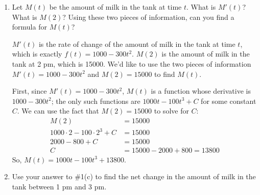 \documentclass[main]{subfiles}
\begin{document}
\begin{enumerate}
\begin{enumerate}
  \item

    \begin{problem}[\stretch{4}]
      Let $M(t)$ be the amount of milk in the tank at time $t$.  What is
      $M'(t)$?  What is $M(2)$?  Using these two pieces of information,
      can you find a formula for $M(t)$?
    \end{problem}

    \begin{solution}
      $M'(t)$ is the rate of change of the amount of milk in the tank at
      time $t$, which is exactly $f(t) = 1000 - 300t^2$.  $M(2)$ is the
      amount of milk in the tank at 2 pm, which is 15000.  We'd like to
      use the two pieces of information $M'(t) = 1000 - 300 t^2$ and $M(2)
      = 15000$ to find $M(t)$.

      First, since $M'(t) = 1000 - 300 t^2$, $M(t)$ is a function whose
      derivative is $1000 - 300 t^2$; the only such functions are $1000 t
      - 100 t^3 + C$ for some constant $C$.  We can use the fact that
      $M(2) = 15000$ to solve for $C$:
      \begin{align*}
        M(2) &= 15000 \\
        1000 \cdot 2 - 100 \cdot 2^3 + C &= 15000 \\
        2000 - 800 + C &= 15000 \\
        C &= 15000 - 2000 + 800 = 13800
      \end{align*}
      So, $M(t) = \boxed{1000 t - 100 t^3 + 13800}$. 
    \end{solution}

  \item


    \begin{problem}[0.75in]
      Use your answer to {{{{\#1}}(c)}} to find the net
      change in the amount of milk in the tank between 1 pm and 3 pm.
    \end{problem}


\end{enumerate}
\end{enumerate}
\end{document}
